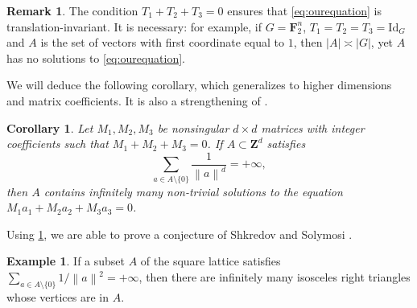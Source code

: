 \documentclass{daj}
\newtheorem{corollary}[theorem]{Corollary}
\theoremstyle{definition}
\newtheorem{remark}[theorem]{Remark}
\newtheorem{example}[theorem]{Example}
\newcommand{\C}{\ensuremath{\mathbf{C}}}
\newcommand{\Z}{\ensuremath{\mathbf{Z}}}
\newcommand{\F}{\ensuremath{\mathbf{F}}}
\newcommand{\norm}[1]{\left\|#1\right\|}
\begin{document}
\begin{remark}%
\label{rem:translation}
The condition $T_1 + T_2 + T_3 = 0$ ensures that \cref{eq:ourequation} is translation-invariant. It is necessary: for example, if $G = \F_2^n$, ${T_1 = T_2 = T_3 = \mathrm{Id}_{G}}$ and $A$ is the set of vectors with first coordinate equal to $1$, then $|A| \asymp |G|$, yet $A$ has no solutions to \cref{eq:ourequation}.
\end{remark}

We will deduce the following corollary, which generalizes \cite[Corollary~1.2]{BS} to higher dimensions and matrix coefficients. It is also a strengthening of \cite[Theorem~2.21]{Bloomthesis}.

\begin{corollary}
\label{cor:matrices}
Let $M_1, M_2, M_3$ be nonsingular $d\times d$ matrices with integer coefficients such that $M_1 + M_2 + M_3 = 0$. If $A \subset \Z^d$ satisfies
\begin{equation*}
\sum_{a\in A\setminus\{0\}} \frac{1}{\norm{a}^d} = +\infty,
\end{equation*}
then $A$ contains infinitely many non-trivial solutions to the equation $M_1 a_1 + M_2 a_2 + M_3 a_3 = 0$.
\end{corollary}


Using \cref{cor:matrices}, we are able to prove a conjecture of Shkredov and Solymosi \cite[Conjecture~2]{SS}.

\begin{example}
\label{ex:IRtriangle}
If a subset $A$ of the square lattice satisfies $\sum_{a\in A\setminus\{0\}} {1}/{\norm{a}^2} = +\infty$, then there are infinitely many isosceles right triangles whose vertices are in $A$.
\end{example}
\end{document}
